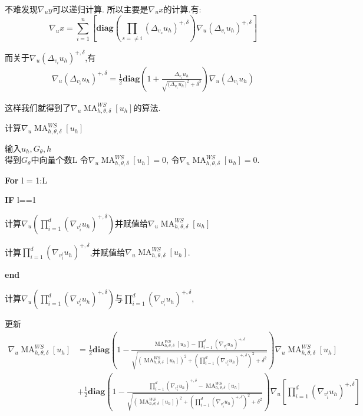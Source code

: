 \documentclass[11pt]{article}
\begin{document}
不难发现$\nabla{}_uy$可以递归计算. 所以主要是$\nabla{}_ux$的计算.有:
$$\nabla_ux=\sum_{i=1}^n\left[\textbf{diag}\left(\prod_{s=\neq i}(\Delta{}_{v_s}u_h)^{+,\delta}\right)\nabla{}_u(\Delta{}_{v_i}u_h)^{+,\delta}\right]$$

而关于$\nabla{}_u(\Delta{}_{v_i}u_h)^{+,\delta}$,有
$$\begin{aligned}
\nabla{}_u(\Delta{}_{v_i}u_h)^{+,\delta}=\frac{1}{2}\textbf{diag}\left(1+\frac{\Delta{}_{v_i}u_h}{\sqrt{(\Delta{}_{v_i}u_h})^2+\delta^2}\right)\nabla{}_u(\Delta{}_{v_i}u_h)
\end{aligned}$$

这样我们就得到了$\nabla{}_u\operatorname{MA}_{h,\theta,\delta}^{WS}[u_h]$的算法.

\begin{algorithm}[H]
\caption{计算$\nabla{}_u\operatorname{MA}_{h,\theta,\delta}^{WS}[u_h]$} 
\begin{algorithmic}[]
\STATE 输入$u_h,G_\theta,h$\\

\STATE 得到$G_\theta$中向量个数L
\STATE 令$\nabla{}_u\operatorname{MA}_{h,\theta,\delta}^{WS}[u_h]=0$, 令$\nabla{}_u\operatorname{MA}_{h,\theta,\delta}^{WS}[u_h]=0$.

\STATE \textbf{For} l = 1:L

\STATE \qquad \textbf{IF} l==1

\STATE \qquad \qquad 计算$\nabla{}_u\left(\prod_{i=1}^d(\nabla{}_{v_i^l}u_h)^{+,\delta}\right)$并赋值给$\nabla{}_u\operatorname{MA}_{h,\theta,\delta}^{WS}[u_h]$

\STATE\qquad \qquad 计算$\prod_{i=1}^d(\nabla{}_{v_i^l}u_h)^{+,\delta}$,并赋值给$\nabla{}_u\operatorname{MA}_{h,\theta,\delta}^{WS}[u_h]$.

\STATE \qquad \textbf{end}

\STATE \qquad 计算$\nabla{}_u\left(\prod_{i=1}^d(\nabla{}_{v_i^l}u_h)^{+,\delta}\right)$与$\prod_{i=1}^d(\nabla{}_{v_i^l}u_h)^{+,\delta}$,

\STATE \qquad  更新
$$\begin{aligned}
\nabla{}_u\operatorname{MA}_{h,\theta,\delta}^{WS}[u_h]&=\frac{1}{2}\textbf{diag}\left(1-\frac{\operatorname{MA}_{h,\theta,\delta}^{WS}[u_h]-\prod_{i=1}^d(\nabla{}_{v_i^l}u_h)^{+,\delta}}{\sqrt{(\operatorname{MA}_{h,\theta,\delta}^{WS}[u_h])^2+(\prod_{i=1}^d(\nabla{}_{v_i^l}u_h)^{+,\delta})^2+\delta^2}}\right)\nabla{}_u\operatorname{MA}_{h,\theta,\delta}^{WS}[u_h]\\
&+\frac{1}{2}\textbf{diag}\left(1-\frac{\prod_{i=1}^d(\nabla{}_{v_i^l}u_h)^{+,\delta}-\operatorname{MA}_{h,\theta,\delta}^{WS}[u_h]}{\sqrt{(\operatorname{MA}_{h,\theta,\delta}^{WS}[u_h])^2+(\prod_{i=1}^d(\nabla{}_{v_i^l}u_h)^{+,\delta})^2+\delta^2}}\right)\nabla{}_u\left[\prod_{i=1}^d(\nabla{}_{v_i^l}u_h)^{+,\delta}\right]
\end{aligned}$$


\end{algorithmic}
\end{algorithm}
\end{document}
